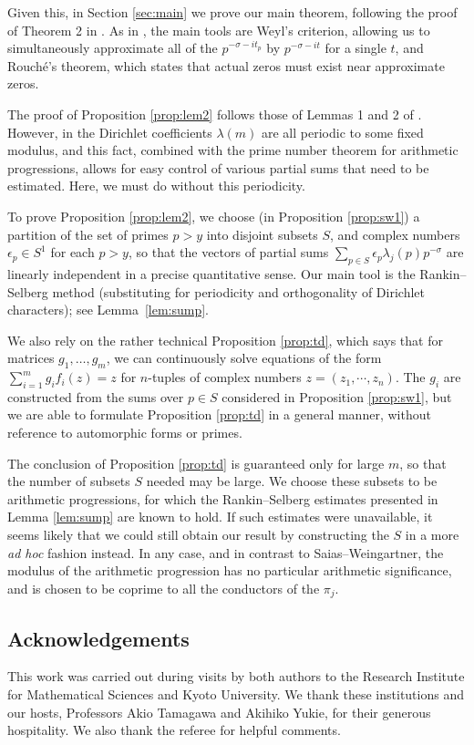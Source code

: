 \documentclass[11pt]{amsart}
\theoremstyle{remark}
\numberwithin{theorem}{section}
\numberwithin{equation}{section}
\begin{document}
Given this, in Section \ref{sec:main} we prove our 
main theorem, following the proof of Theorem 2 in \cite{SW}.
As in \cite{SW}, the main tools are Weyl's criterion, allowing us to simultaneously approximate all of the $p^{-\sigma - it_p}$ by
$p^{- \sigma - it}$ for a single $t$, and Rouch\'e's theorem, which states that actual zeros must exist near approximate zeros.

The proof of Proposition \ref{prop:lem2} follows those of Lemmas 1 and 2 of \cite{SW}. However, in \cite{SW} the Dirichlet
coefficients $\lambda(m)$ are all periodic to some fixed modulus,
and this fact, combined with the prime number theorem for arithmetic progressions, allows for easy control of various partial sums that need
to be estimated.
Here, we must do without this periodicity.

To prove Proposition \ref{prop:lem2}, we choose (in Proposition \ref{prop:sw1}) a partition of the set of primes $p > y$ into disjoint subsets $S$, and  complex numbers
$\epsilon_p \in S^1$ for each $p > y$, so that the vectors of partial sums 
$\sum_{p \in S} \epsilon_p \lambda_j(p) p^{-\sigma}$ are linearly independent in a precise quantitative
sense. Our main tool is the Rankin--Selberg method (substituting for
periodicity and orthogonality of Dirichlet characters);
see Lemma~\ref{lem:sump}. 

We also rely on the rather technical Proposition \ref{prop:td}, which says that
for matrices $g_1, \dots, g_m$, 
we can continuously solve equations of the form
$\sum_{i = 1}^m g_i f_i(z) = z$ for $n$-tuples of complex numbers
$z = (z_1, \cdots, z_n)$. The $g_i$ are constructed from the sums over $p \in S$ considered in Proposition 
\ref{prop:sw1}, but we are able to formulate Proposition \ref{prop:td} in a general manner, without reference to automorphic
forms or primes.

The conclusion of Proposition \ref{prop:td} is guaranteed only for large $m$, so that the number of subsets $S$ needed may be large. We choose these subsets to be arithmetic
progressions, for which the Rankin--Selberg 
estimates presented in Lemma \ref{lem:sump} are known to hold. If such estimates were unavailable, it seems likely that
we could still obtain our result by constructing the $S$ in a more {\itshape ad hoc} fashion
instead. In any case, and in contrast to Saias--Weingartner, the modulus of the arithmetic progression has no particular arithmetic significance,
and is chosen to be coprime to all the conductors of the $\pi_j$.

\subsection*{Acknowledgements}
This work was carried out during visits by both authors to the Research
Institute for Mathematical Sciences and Kyoto University. We thank these
institutions and our hosts, Professors Akio Tamagawa and Akihiko Yukie,
for their generous hospitality. We also thank the referee for helpful comments.
\end{document}
